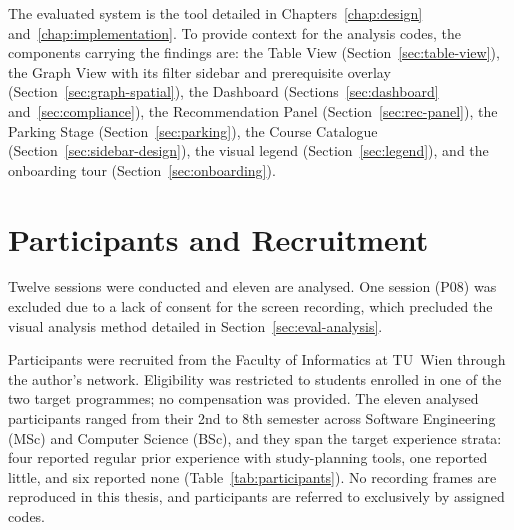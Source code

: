 The evaluated system is the tool detailed in Chapters~\ref{chap:design} and~\ref{chap:implementation}. To provide context for the analysis codes, the components carrying the findings are: the Table View (Section~\ref{sec:table-view}), the Graph View with its filter sidebar and prerequisite overlay (Section~\ref{sec:graph-spatial}), the Dashboard (Sections~\ref{sec:dashboard} and~\ref{sec:compliance}), the Recommendation Panel (Section~\ref{sec:rec-panel}), the Parking Stage (Section~\ref{sec:parking}), the Course Catalogue (Section~\ref{sec:sidebar-design}), the visual legend (Section~\ref{sec:legend}), and the onboarding tour (Section~\ref{sec:onboarding}).

\section{Participants and Recruitment}
\label{sec:eval-participants}
Twelve sessions were conducted and eleven are analysed. One session (P08) was excluded due to a lack of consent for the screen recording, which precluded the visual analysis method detailed in Section~\ref{sec:eval-analysis}.

Participants were recruited from the Faculty of Informatics at TU~Wien through the author's network. Eligibility was restricted to students enrolled in one of the two target programmes; no compensation was provided. The eleven analysed participants ranged from their 2nd to 8th semester across Software Engineering (MSc) and Computer Science (BSc), and they span the target experience strata: four reported regular prior experience with study-planning tools, one reported little, and six reported none (Table~\ref{tab:participants}). No recording frames are reproduced in this thesis, and participants are referred to exclusively by assigned codes.

